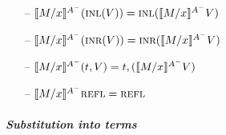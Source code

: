 \begin{itemize}
\smallskip

\item[--] $\rsubsta{M}{x}{(\tinl{V})}{A^-} 
           = \tinl{\rsubsta{M}{x}{V}{A^-}}$
\item[--] $\rsubsta{M}{x}{(\tinr{V})}{A^-} 
           = \tinr{\rsubsta{M}{x}{V}{A^-}}$
\item[--] $\rsubsta{M}{x}{(\texistsr{t}{V})}{A^-} 
           = \texistsr{t}{(\rsubsta{M}{x}{V}{A^-})}$
\item[--] $\rsubsta{M}{x}{\tunifr}{A^-} = \tunifr$
\end{itemize}

\paragraph{\it Substitution into terms}

